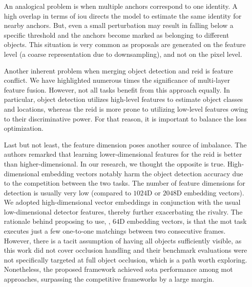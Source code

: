 An analogical problem is when multiple anchors correspond to one identity. A high overlap in terms of \gls{iou} directs the model to estimate the same identity for nearby anchors. But, even a small perturbation may result in falling below a specific threshold and the anchors become marked as belonging to different objects. This situation is very common as proposals are generated on the feature level (a coarse representation due to downsampling), and not on the pixel level.

Another inherent problem when merging object detection and \gls{reid} is feature conflict. We have highlighted numerous times the significance of multi-layer feature fusion. However, not all tasks benefit from this approach equally. In particular, object detection utilizes high-level features to estimate object classes and locations, whereas the \gls{reid} is more prone to utilizing low-level features owing to their discriminative power. For that reason, it is important to balance the loss optimization.

Last but not least, the feature dimension poses another source of imbalance. The authors remarked that learning lower-dimensional features for the \gls{reid} is better than higher-dimensional. In our research, we thought the opposite is true. High-dimensional embedding vectors notably harm the object detection accuracy due to the competition between the two tasks. The number of feature dimensions for detection is usually very low (compared to $1024$D or $2048$D embedding vectors). We adopted high-dimensional vector embeddings in conjunction with the usual low-dimensional detector features, thereby further exacerbating the rivalry. The rationale behind proposing to use, \egtext{}, $64$D embedding vectors, is that the \gls{mot} task executes just a few one-to-one matchings between two consecutive frames. However, there is a tacit assumption of having all objects sufficiently visible, as this work did not cover occlusion handling and their benchmark evaluations were not specifically targeted at full object occlusion, which is a path worth exploring. Nonetheless, the proposed framework achieved \gls{sota} performance among \gls{mot} approaches, surpassing the competitive frameworks by a large margin.
